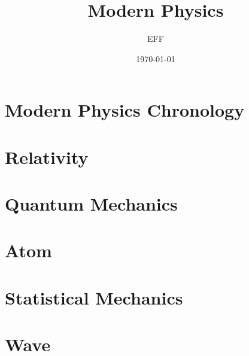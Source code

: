 \documentclass[10pt]{report}
\title{Modern Physics}
\author{EFF}
\date{\today}
\begin{document}
\pagestyle{empty}


\clearpage

\section*{Modern Physics Chronology}

\clearpage 

\section*{Relativity}

\clearpage

\clearpage

\section*{Quantum Mechanics}

\clearpage

\section*{Atom}

\clearpage

\clearpage

\section*{Statistical Mechanics}

\clearpage

\section*{Wave}

\clearpage
\end{document}
